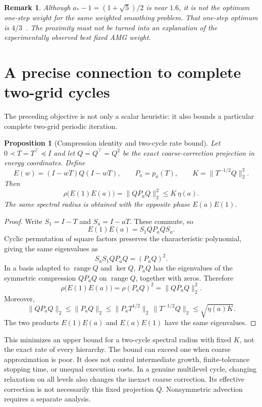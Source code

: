 \documentclass[11pt]{article}
\newtheorem{proposition}{Proposition}
\newtheorem{remark}{Remark}
\begin{document}
\begin{remark}
Although $a_*-1=(1+\sqrt5)/2$ is near $1.6$, it is not the optimum
one-step weight for the same weighted smoothing problem. That one-step
optimum is $4/3$~\cite{lottes}. The proximity must not be turned into
an explanation of the experimentally observed best fixed AMG weight.
\end{remark}

\section{A precise connection to complete two-grid cycles}
The preceding objective is not only a scalar heuristic: it also bounds a
particular complete two-grid periodic iteration.

\begin{proposition}[Compression identity and two-cycle rate bound]
Let $0\prec T=T^\top\preceq I$ and let $Q=Q^\top=Q^2$ be the exact
coarse-correction projection in energy coordinates. Define
\[
 E(w)=(I-wT)Q(I-wT),\qquad P_a=p_a(T),\qquad
 K=\|T^{-1/2}Q\|_2^2.
\]
Then
\[
 \rho\big(E(1)E(a)\big)
 =\|QP_aQ\|_2^2
 \le K\,\eta(a).
\]
The same spectral radius is obtained with the opposite phase
$E(a)E(1)$.
\end{proposition}
\begin{proof}
Write $S_1=I-T$ and $S_a=I-aT$. These commute, so
\[
 E(1)E(a)=S_1 QP_a Q S_a.
\]
Cyclic permutation of square factors preserves the characteristic
polynomial, giving the same eigenvalues as
\[
 S_aS_1QP_aQ=(P_aQ)^2.
\]
In a basis adapted to $\operatorname{range}Q$ and $\ker Q$, $P_aQ$
has the eigenvalues of the symmetric compression $QP_aQ$ on
$\operatorname{range}Q$, together with zeros. Therefore
\[
 \rho\big(E(1)E(a)\big)=\rho(P_aQ)^2=\|QP_aQ\|_2^2.
\]
Moreover,
\[
 \|QP_aQ\|_2
 \le\|P_aQ\|_2
 \le\|P_aT^{1/2}\|_2\,\|T^{-1/2}Q\|_2
 \le\sqrt{\eta(a)K}.
\]
The two products $E(1)E(a)$ and $E(a)E(1)$ have the same eigenvalues.
\end{proof}

This minimizes an upper bound for a two-cycle spectral radius with fixed
$K$, not the exact rate of every hierarchy. The bound can exceed one
when coarse approximation is poor. It does not control intermediate
growth, finite-tolerance stopping time, or unequal execution costs.
In a genuine multilevel cycle, changing relaxation on all levels also
changes the inexact coarse correction. Its effective correction is
not necessarily this fixed projection $Q$. Nonsymmetric advection
requires a separate analysis.
\end{document}

